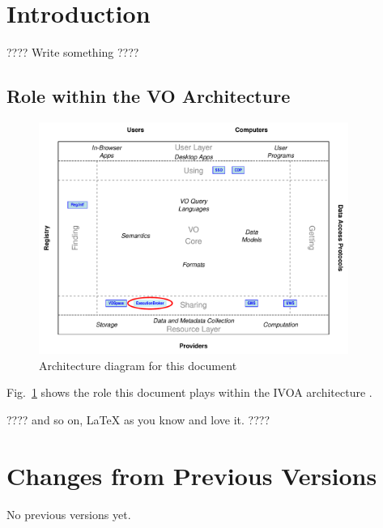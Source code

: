 \documentclass[11pt,a4paper]{ivoa}
\begin{document}
\section{Introduction}

???? Write something ????

\subsection{Role within the VO Architecture}

\begin{figure}
\centering


\includegraphics[width=0.9\textwidth]{role_diagram.pdf}
\caption{Architecture diagram for this document}
\label{fig:archdiag}
\end{figure}

Fig.~\ref{fig:archdiag} shows the role this document plays within the
IVOA architecture \citep{2021ivoa.spec.1101D}.

???? and so on, LaTeX as you know and love it. ????

\appendix
\section{Changes from Previous Versions}

No previous versions yet.



\end{document}

